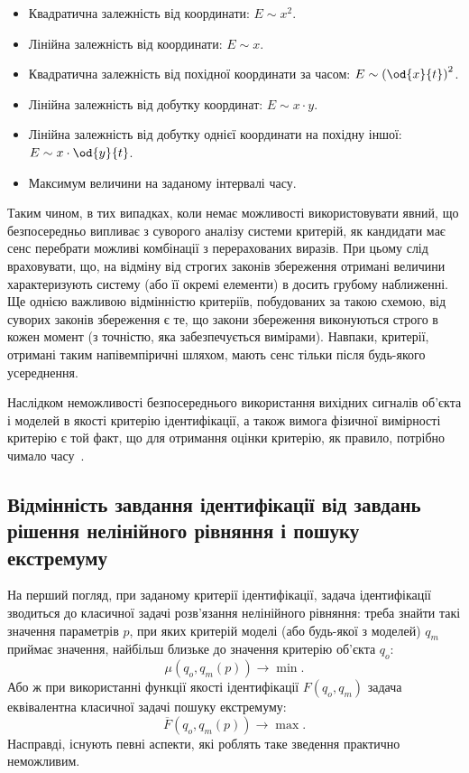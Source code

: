 \begin{itemize}

  \item
    Квадратична залежність від координати:
    $E \sim x^2$.

  \item
    Лінійна залежність від координати:
    $E \sim x$.

  \item
    Квадратична залежність від похідної координати за часом:
    $E \sim \left( \od{x}{t}\right)^2$.

  \item
    Лінійна залежність від добутку координат:
    $E \sim x \cdot y$.

  \item
    Лінійна залежність від добутку однієї координати на похідну іншої:
    $E \sim x \cdot \od{y}{t}$.

  \item
  Максимум величини на заданому інтервалі часу.

\end{itemize}

Таким чином, в тих випадках, коли немає можливості
використовувати явний, що безпосередньо випливає з суворого
аналізу системи критерій, як кандидати має сенс перебрати
можливі комбінації з перерахованих виразів. При цьому слід
враховувати, що, на відміну від строгих законів збереження
отримані величини характеризують систему (або її окремі
елементи) в досить грубому наближенні. Ще однією важливою
відмінністю критеріїв, побудованих за такою схемою, від суворих
законів збереження є те, що закони збереження виконуються строго
в кожен момент (з точністю, яка забезпечується вимірами). Навпаки,
критерії, отримані таким напівемпіричні шляхом, мають сенс
тільки після будь-якого усереднення.

Наслідком неможливості безпосереднього використання вихідних
сигналів об'єкта і моделей в якості критерію ідентифікації,
а також вимога фізичної вимірності критерію є той факт, що
для отримання оцінки критерію, як правило, потрібно чимало
часу~\cite{atu_ich2011, atu_DSMP2016}.



\subsection{Відмінність завдання ідентифікації від завдань рішення нелінійного рівняння і пошуку екстремуму} %

На перший погляд, при заданому критерії ідентифікації, задача ідентифікації
зводиться до класичної задачі розв'язання нелінійного рівняння: треба знайти
такі значення параметрів $p$, при яких критерій моделі (або будь-якої з
моделей) $q_m$ приймає значення, найбільш близьке до значення критерію
об'єкта $q_o$:
\[
  \mu( q_o, q_m(p) ) \to \min.
\]
%
Або ж при використанні функції якості ідентифікації
$ F (q_o, q_m) $ задача еквівалентна класичної задачі пошуку
екстремуму:
%
\[
  \overline{F}( q_o, q_m(p) ) \to \max.
\]
%
Насправді, існують певні аспекти, які роблять таке зведення практично
неможливим.

